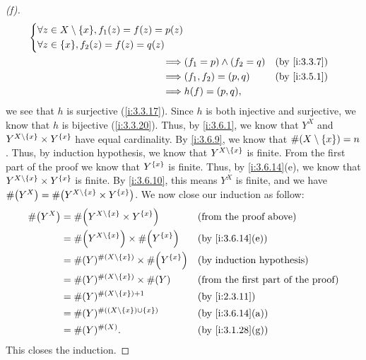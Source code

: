 \begin{proof}[(f)]
\begin{align*}
\begin{dcases}
                 \forall z \in X \setminus \set{x}, f_1(z) = f(z) = p(z) \\
                 \forall z \in \set{x}, f_2(z) = f(z) = q(z)
               \end{dcases}                      \\
    \implies & (f_1 = p) \land (f_2 = q)                                  &  & \by{i:3.3.7} \\
    \implies & (f_1, f_2) = (p, q)                                        &  & \by{i:3.5.1} \\
    \implies & h(f) = (p, q),
  \end{align*}
  we see that \(h\) is surjective (\cref{i:3.3.17}).
  Since \(h\) is both injective and surjective, we know that \(h\) is bijective (\cref{i:3.3.20}).
  Thus, by \cref{i:3.6.1}, we know that \(Y^X\) and \(Y^{X \setminus \left\lbrace x\right\rbrace} \times Y^{\left\lbrace x\right\rbrace}\) have equal cardinality.
  By \cref{i:3.6.9}, we know that \(\#(X \setminus \left\lbrace x\right\rbrace) = n\).
  Thus, by induction hypothesis, we know that \(Y^{X \setminus \left\lbrace x\right\rbrace}\) is finite.
  From the first part of the proof we know that \(Y^{\left\lbrace x\right\rbrace}\) is finite.
  Thus, by \cref{i:3.6.14}(e), we know that \(Y^{X \setminus \left\lbrace x\right\rbrace} \times Y^{\left\lbrace x\right\rbrace}\) is finite.
  By \cref{i:3.6.10}, this means \(Y^X\) is finite, and we have \(\#\pa{Y^X} = \#\pa{Y^{X \setminus \set{x}} \times Y^{\set{x}}}\).
  We now close our induction as follow:
  \begin{align*}
    \#\pa{Y^X} & = \#\pa{Y^{X \setminus \set{x}} \times Y^{\set{x}}}         &  & \text{(from the proof above)}             \\
               & = \#\pa{Y^{X \setminus \set{x}}} \times \#\pa{Y^{\set{x}}}  &  & \by{i:3.6.14}[e]                          \\
               & = \#(Y)^{\#(X \setminus \set{x})} \times \#\pa{Y^{\set{x}}} &  & \byIH                                     \\
               & = \#(Y)^{\#(X \setminus \set{x})} \times \#(Y)              &  & \text{(from the first part of the proof)} \\
               & = \#(Y)^{\#(X \setminus \set{x}) + 1}                       &  & \by{i:2.3.11}                             \\
               & = \#(Y)^{\#((X \setminus \set{x}) \cup \set{x})}            &  & \by{i:3.6.14}[a]                          \\
               & = \#(Y)^{\#(X)}.                                            &  & \by{i:3.1.28}[g]
  \end{align*}
  This closes the induction.
\end{proof}

